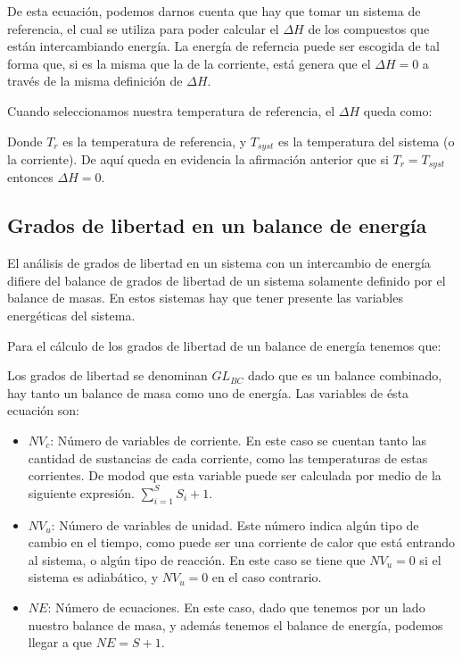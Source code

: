 De esta ecuación, podemos darnos cuenta que hay que tomar un sistema de referencia, el cual se utiliza para poder calcular el $\Delta H$ de los compuestos que están intercambiando energía.
La energía de referncia puede ser escogida de tal forma que, si es la misma que la de la corriente, está genera que el $\Delta H=0$ a través de la misma definición de $\Delta H$.

Cuando seleccionamos nuestra temperatura de referencia, el $\Delta H$ queda como:


Donde $T_r$ es la temperatura de referencia, y $T_{syst}$ es la temperatura del sistema (o la corriente). De aquí queda en evidencia la afirmación anterior que si $T_r = T_{syst}$ entonces $\Delta H=0$.
\clearpage
\subsection{Grados de libertad en un balance de energía}

El análisis de grados de libertad en un sistema con un intercambio de energía difiere del balance de grados de libertad de un sistema solamente definido por el balance de masas.
En estos sistemas hay que tener presente las variables energéticas del sistema.

Para el cálculo de los grados de libertad de un balance de energía tenemos que:


Los grados de libertad se denominan $GL_{BC}$ dado que es un balance combinado, hay tanto un balance de masa como uno de energía. 
Las variables de ésta ecuación son:

\begin{itemize}
    \item $NV_c$: Número de variables de corriente. En este caso se cuentan tanto las cantidad de sustancias de cada corriente, como las temperaturas de estas corrientes. De modod que esta variable puede ser calculada por medio de la siguiente expresión. $\sum_{i=1}^{S} S_i+1$.
    \item $NV_u$: Número de variables de unidad. Este número indica algún tipo de cambio en el tiempo, como puede ser una corriente de calor que está entrando al sistema, o algún tipo de reacción. En este caso se tiene que $NV_u=0$ si el sistema es adiabático, y $NV_u=0$ en el caso contrario.
    \item $NE$: Número de ecuaciones. En este caso, dado que tenemos por un lado nuestro balance de masa, y además tenemos el balance de energía, podemos llegar a que $NE=S+1$.
\end{itemize}



